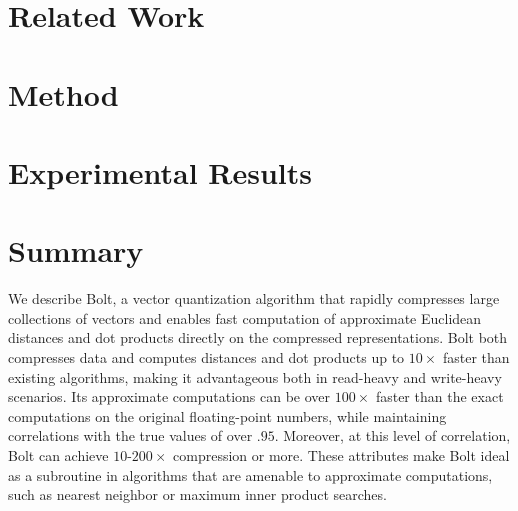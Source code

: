 \documentclass[sigconf]{acmart}  %
\begin{document}
% 

\section{Related Work} \label{sec:relatedWork}



\section{Method} \label{sec:method}



\section{Experimental Results} \label{sec:results}



\vspace{-1mm}
\section{Summary} \label{sec:conclusion}

We describe Bolt, a vector quantization algorithm that rapidly compresses large collections of vectors and enables fast computation of approximate Euclidean distances and dot products directly on the compressed representations. Bolt both compresses data and computes distances and dot products up to $10\times$ faster than existing algorithms, making it advantageous both in read-heavy and write-heavy scenarios. Its approximate computations can be over $100\times$ faster than the exact computations on the original floating-point numbers, while maintaining correlations with the true values of over $.95$. Moreover, at this level of correlation, Bolt can achieve $10$-$200\times$ compression or more. These attributes make Bolt ideal as a subroutine in algorithms that are amenable to approximate computations, such as nearest neighbor or maximum inner product searches.
\end{document}
